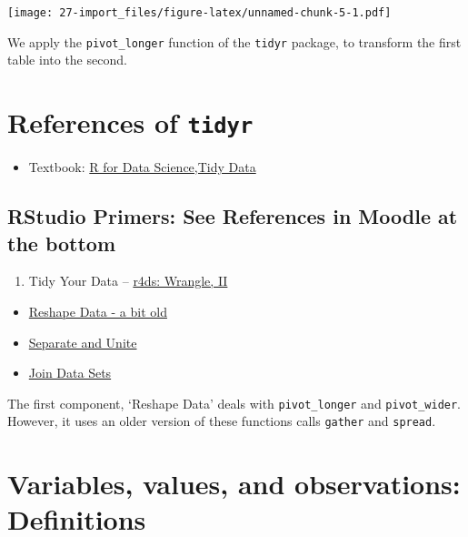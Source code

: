 \documentclass[
  xelatex, ja=standard]{bxjsbook}
\providecommand{\tightlist}{%
  \setlength{\itemsep}{0pt}\setlength{\parskip}{0pt}}
\theoremstyle{definition}
\theoremstyle{definition}
\theoremstyle{definition}
\theoremstyle{definition}
\theoremstyle{remark}
\begin{document}
\texttt{[image: 27-import\_files/figure-latex/unnamed-chunk-5-1.pdf]}

We apply the \texttt{pivot\_longer} function of the \texttt{tidyr} package, to transform the first table into the second.

\hypertarget{references-of-tidyr}{%
\section{\texorpdfstring{References of \texttt{tidyr}}{References of tidyr}}\label{references-of-tidyr}}

\begin{itemize}
\tightlist
\item
  Textbook: \href{https://r4ds.had.co.nz/tidy-data.html\#tidy-data}{R for Data Science,Tidy Data}
\end{itemize}

\hypertarget{rstudio-primers-see-references-in-moodle-at-the-bottom}{%
\subsection{RStudio Primers: See References in Moodle at the bottom}\label{rstudio-primers-see-references-in-moodle-at-the-bottom}}

\begin{enumerate}
\def\labelenumi{\arabic{enumi}.}
\setcounter{enumi}{3}
\tightlist
\item
  Tidy Your Data -- \href{https://r4ds.had.co.nz/wrangle-intro.html\#wrangle-intro}{r4ds: Wrangle, II}
\end{enumerate}

\begin{itemize}
\tightlist
\item
  \href{https://rstudio.cloud/learn/primers/4.1}{Reshape Data - a bit old}
\item
  \href{https://rstudio.cloud/learn/primers/4.2}{Separate and Unite}
\item
  \href{https://rstudio.cloud/learn/primers/4.3}{Join Data Sets}
\end{itemize}

The first component, `Reshape Data' deals with \texttt{pivot\_longer} and \texttt{pivot\_wider}. However, it uses an older version of these functions calls \texttt{gather} and \texttt{spread}.

\hypertarget{variables-values-and-observations-definitions}{%
\section{Variables, values, and observations: Definitions}\label{variables-values-and-observations-definitions}}
\end{document}
